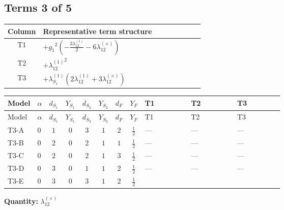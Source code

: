\documentclass[8pt]{article}
\begin{document}
\begin{landscape}
\subsection*{Terms 3 of 5}
\begin{center}
\begin{tabular}{@{}c >{\raggedright\arraybackslash}p{0.82\linewidth}@{}}
\toprule
Column & Representative term structure \\
\midrule
T1 & \(\displaystyle +{g_1}^2 \left(-\frac{3 {\lambda_{12}^{(1)}}}{2}-6 {\lambda_{12}^{(\times)}}\right)\) \\
\midrule
T2 & \(\displaystyle +{\lambda_{12}^{(1)}}^2\) \\
\midrule
T3 & \(\displaystyle +{\lambda_{S_1}^{(1)}} (2 {\lambda_{12}^{(1)}}+3 {\lambda_{12}^{(\times)}})\) \\
\midrule
\bottomrule
\end{tabular}
\end{center}
\smallskip
\tiny
\begin{longtable}{@{}llcccccc >{\raggedright\arraybackslash}p{0.21\linewidth} >{\raggedright\arraybackslash}p{0.21\linewidth} >{\raggedright\arraybackslash}p{0.21\linewidth}@{}}
\toprule
Model & $\alpha$ & $d_{S_1}$ & $Y_{S_1}$ & $d_{S_2}$ & $Y_{S_2}$ & $d_F$ & $Y_F$ & T1 & T2 & T3 \\
\midrule
\endfirsthead
\toprule
Model & $\alpha$ & $d_{S_1}$ & $Y_{S_1}$ & $d_{S_2}$ & $Y_{S_2}$ & $d_F$ & $Y_F$ & T1 & T2 & T3 \\
\midrule
\endhead
T3-A & $0$ & $1$ & $0$ & $3$ & $1$ & $2$ & $\frac{1}{2}$ & --- & --- & --- \\
\midrule
T3-B & $0$ & $2$ & $0$ & $2$ & $1$ & $1$ & $\frac{1}{2}$ & --- & --- & --- \\
\midrule
T3-C & $0$ & $2$ & $0$ & $2$ & $1$ & $3$ & $\frac{1}{2}$ & --- & --- & --- \\
\midrule
T3-D & $0$ & $3$ & $0$ & $1$ & $1$ & $2$ & $\frac{1}{2}$ & --- & --- & --- \\
\midrule
T3-E & $0$ & $3$ & $0$ & $3$ & $1$ & $2$ & $\frac{1}{2}$ & \scriptsize\adjustbox{max width=\linewidth}{$\begin{gathered} +{g_1}^2 \left(-\frac{3 {\lambda_{12}^{(1)}}}{2}-6 {\lambda_{12}^{(\times)}}\right)\end{gathered}$} & \scriptsize\adjustbox{max width=\linewidth}{$\begin{gathered} +{\lambda_{12}^{(1)}}^2\end{gathered}$} & \scriptsize\adjustbox{max width=\linewidth}{$\begin{gathered} +{\lambda_{S_1}^{(1)}} (2 {\lambda_{12}^{(1)}}+3 {\lambda_{12}^{(\times)}})\end{gathered}$} \\
\midrule
\bottomrule
\end{longtable}
\clearpage
\noindent\textbf{Quantity: }$\lambda_{12}^{(\times)}$\par\smallskip

\end{landscape}
\end{document}
